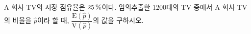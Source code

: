 $\mathrm{A}$ 회사 TV의 시장 점유율은 $25\mkern3mu \%$이다. 임의추출한 $1200$대의 TV 중에서 $\mathrm{A}$ 회사 TV의 비율을 $\hat{p}$이라 할 때, $\dfrac{\mathrm{E}(\hat{p})}{\mathrm{V}(\hat{p})}$의 값을 구하시오.
